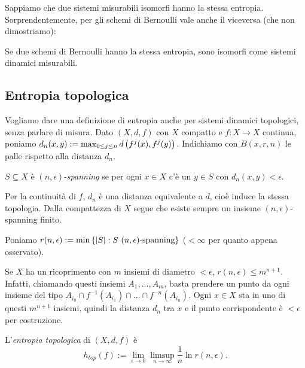Sappiamo che due sistemi misurabili isomorfi hanno la stessa entropia. Sorprendentemente, per gli schemi di Bernoulli vale anche il viceversa
(che non dimostriamo):

\begin{teo}[Ornstein]Se due schemi di Bernoulli hanno la stessa entropia, sono isomorfi come sistemi dinamici misurabili.
\end{teo}

\subsection{Entropia topologica}

Vogliamo dare una definizione di entropia anche per sistemi dinamici topologici, senza parlare di misura.
Dato $(X,d,f)$ con $X$ compatto e $f:X\to X$ continua, poniamo $d_n(x,y):=\max_{0\le j\le n}d\left(f^j(x),f^j(y)\right)$.
Indichiamo con $B(x,r,n)$ le palle rispetto alla distanza $d_n$.

\begin{defi}$S\subseteq X$ è $(n,\epsilon)$-\emph{spanning} se per ogni $x\in X$ c'è un $y\in S$
con $d_n(x,y)<\epsilon$.
\end{defi}

\begin{oss}Per la continuità di $f$, $d_n$ è una distanza equivalente a $d$, cioè
induce la stessa topologia. Dalla compattezza di $X$ segue che esiste sempre un insieme $(n,\epsilon)$-spanning finito.
\end{oss}

\begin{defi}Poniamo $r(n,\epsilon):=\min\set{\abs{S}:S\ (n,\epsilon)\text{-spanning}}$ ($<\infty$
per quanto appena osservato).
\end{defi}

\begin{oss}Se $X$ ha un ricoprimento con $m$ insiemi di diametro $<\epsilon$, $r(n,\epsilon)\le m^{n+1}$.
Infatti, chiamando questi insiemi $A_1,\dots,A_m$, basta prendere un punto da ogni insieme del tipo
$A_{i_0}\cap f^{-1}(A_{i_1})\cap\dots\cap f^{-n}(A_{i_n})$. Ogni $x\in X$ sta in uno di questi $m^{n+1}$ insiemi,
quindi la distanza $d_n$ tra $x$ e il punto corrispondente è $<\epsilon$ per costruzione.
\end{oss}

\begin{defi}L'\emph{entropia topologica} di $(X,d,f)$ è
\[ h_{top}(f):=\lim_{\epsilon\to 0}\limsup_{n\to\infty}\frac{1}{n}\ln r(n,\epsilon). \]
\end{defi}

